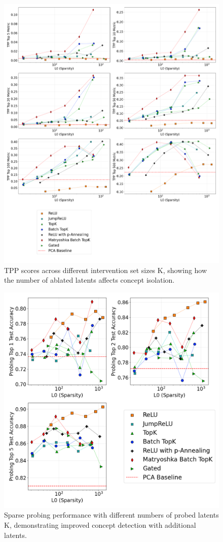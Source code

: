 \documentclass{article}
\theoremstyle{plain}
\theoremstyle{definition}
\theoremstyle{remark}
\begin{document}
\begin{figure}[h!]
\centering
\includegraphics[width=\columnwidth]{images/scr_tpp_sparse_probing_ks/plot_2x4_sae_bench_gemma-2-2b_65k_architecture_series_layer_12_tpp.png}
\caption{TPP scores across different intervention set sizes K, showing how the number of ablated latents affects concept isolation.}
\end{figure}

\begin{figure}[h!]
\centering
\includegraphics[width=0.8\columnwidth]{images/scr_tpp_sparse_probing_ks/plot_2x4_sae_bench_gemma-2-2b_65k_architecture_series_layer_12_sparse_probing.png}
\caption{Sparse probing performance with different numbers of probed latents K, demonstrating improved concept detection with additional latents.}
\end{figure}
\end{document}
